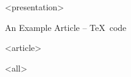 \mode
<presentation>

\begin{frame}{An Example Article -- \TeX~code}
  \label{example:art:tex1}

  \begin{example}[start of the tex file]
    }
  \end{example}
\end{frame}




\mode
<article>

\bigskip


\mode
<all>
